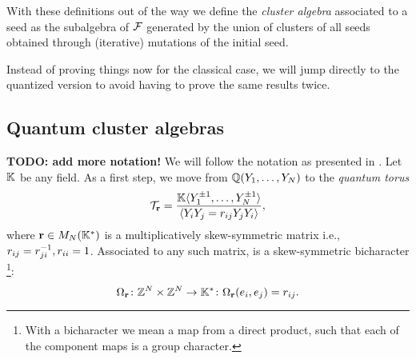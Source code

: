 \documentclass{article}
\begin{document}
\medskip

With these definitions out of the way we define the \emph{cluster algebra} associated
to a seed as the subalgebra of $\mathcal{F}$ generated by the union of clusters of all seeds
obtained through (iterative) mutations of the initial seed.

Instead of proving things now for the classical case, we will jump directly to the
quantized version to avoid having to prove the same results twice.

\subsection{Quantum cluster algebras}

\textbf{TODO: add more notation!}
We will follow the notation as presented in \cite{GoodearlYakimov2017QCA}.
Let $\mathbb{K}$ be any field.
As a first step, we move from $\mathbb{Q}(Y_1, \dots, Y_N)$ to
the \emph{quantum torus}
\begin{equation*}
	\mathcal{T}_{\mathbf r} =
	\frac{\mathbb{K}\langle Y_1^{\pm 1}, \dots, Y_N^{\pm 1} \rangle}{\langle Y_iY_j = r_{ij}Y_jY_i \rangle},
\end{equation*}
where $\mathbf{r} \in M_N(\mathbb{K}^*)$ is a multiplicatively skew-symmetric matrix i.e.,
$r_{ij} = r_{ji}^{-1}, r_{ii} = 1$.
Associated to any such matrix, is a skew-symmetric bicharacter
\footnote{With a bicharacter we mean a map from a direct product,
	such that each of the component maps is a group character.}:
\begin{equation*}
	\Omega_{\mathbf{r}} \colon \mathbb{Z}^N \times \mathbb{Z}^N \to \mathbb{K}^* \colon
	\Omega_{\mathbf{r}}(e_i, e_j) = r_{ij}.
\end{equation*}
\end{document}
